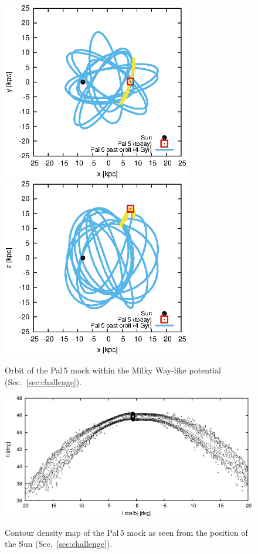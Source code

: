 \begin{figure}
\includegraphics[width=83mm]{./figures/pal5_orbit.eps}\\
\includegraphics[width=83mm]{./figures/pal5_orbit_xz.eps}
  \caption{Orbit of the Pal\,5 mock within the Milky Way-like potential (Sec.~\ref{sec:challenge}).}
  \label{plot_pal5_orbit}
\end{figure}

\begin{figure}
\includegraphics[width=168mm]{./figures/pal5_contour.eps}\\
  \caption{Contour density map of the Pal\,5 mock as seen from the position of the Sun (Sec.~\ref{sec:challenge}).}
  \label{plot_pal5_contour}
\end{figure}

